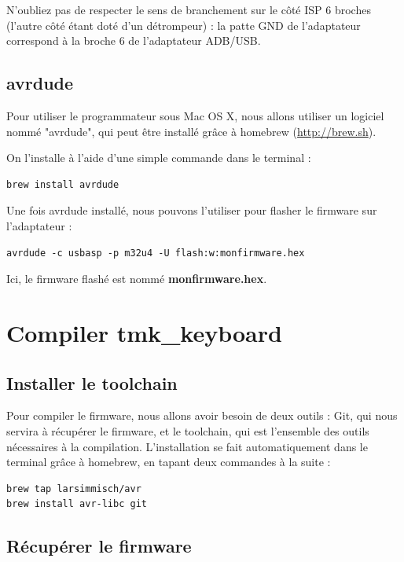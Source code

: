 \documentclass[12pt,a4paper,final]{article}
\begin{document}
N'oubliez pas de respecter le sens de branchement sur le côté ISP 6 broches (l'autre côté étant doté d'un détrompeur) : la patte GND de l'adaptateur correspond à la broche 6 de l'adaptateur ADB/USB.

\subsection{avrdude}

Pour utiliser le programmateur sous Mac OS X, nous allons utiliser un logiciel nommé "avrdude", qui peut être installé grâce à homebrew (\url{http://brew.sh}).

On l'installe à l'aide d'une simple commande dans le terminal :

\begin{verbatim}
brew install avrdude
\end{verbatim}

Une fois avrdude installé, nous pouvons l'utiliser pour flasher le firmware sur l'adaptateur :

\begin{verbatim}
avrdude -c usbasp -p m32u4 -U flash:w:monfirmware.hex
\end{verbatim}

Ici, le firmware flashé est nommé \textbf{monfirmware.hex}.

\section{Compiler tmk\_keyboard}

\subsection{Installer le toolchain}

Pour compiler le firmware, nous allons avoir besoin de deux outils : Git, qui nous servira à récupérer le firmware, et le toolchain, qui est l'ensemble des outils nécessaires à la compilation.
L'installation se fait automatiquement dans le terminal grâce à homebrew, en tapant deux commandes à la suite :

\begin{verbatim}
brew tap larsimmisch/avr
brew install avr-libc git
\end{verbatim}

\subsection{Récupérer le firmware}
\end{document}
